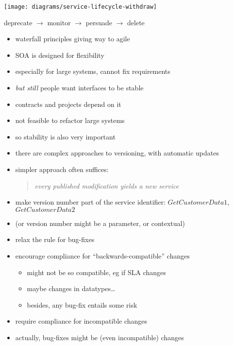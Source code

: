 \documentclass{sepslide-soa-faked} %
\begin{document}
\begin{slide}
\begin{center}
\texttt{[image: diagrams/service-lifecycle-withdraw]}
\end{center}
deprecate $\to$ monitor $\to$ persuade $\to$ delete
\end{slide}

\begin{slide}
\begin{itemize}
\item waterfall principles giving way to agile
\item SOA is designed for flexibility
\item especially for large systems, cannot fix requirements
\medskip
\item \emph{but still} people want interfaces to be stable
\item contracts and projects depend on it
\item not feasible to refactor large systems
\item so stability is also very important
\end{itemize}
\end{slide}

\begin{slide}
\begin{itemize}
\item there are complex approaches to versioning, with automatic updates
\item simpler approach often suffices:
\begin{quote}
\emph{every published modification yields a new service}
\end{quote}
\item make version number part of the service identifier:
$GetCustomerData1$, $GetCustomerData2$
\item (or version number might be a parameter, or contextual)
\end{itemize}
\end{slide}

\begin{slide}
\begin{itemize}
\item relax the rule for bug-fixes
\item encourage compliance for ``backwards-compatible'' changes
  \begin{itemize}
  \item might not be so compatible, eg if SLA changes
  \item maybe changes in datatypes\ldots
  \item besides, any bug-fix entails some risk
  \end{itemize}
\item require compliance for incompatible changes
\medskip
\item actually, bug-fixes might be (even incompatible) changes
\end{itemize}
\end{slide}
\end{document}
